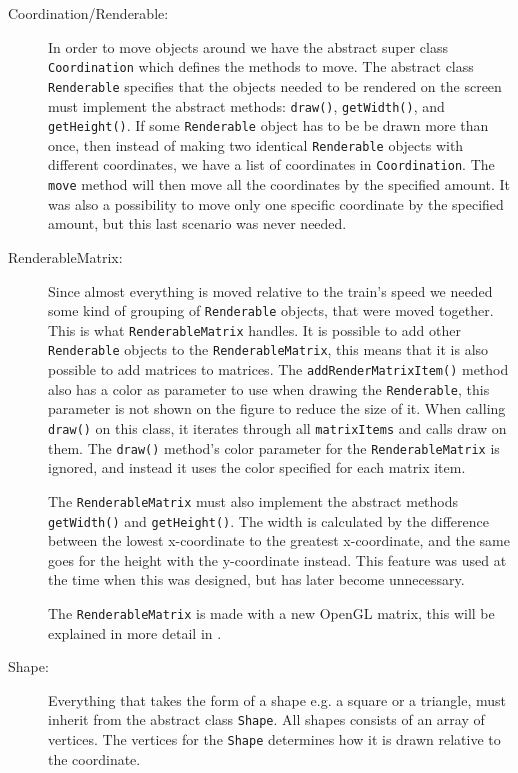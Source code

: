 \begin{description}
\item[Coordination/Renderable:] In order to move objects around we have the abstract super class \lstinline|Coordination| which defines the methods to move. The abstract class \lstinline|Renderable| specifies that the objects needed to be rendered on the screen must implement the abstract methods: \lstinline|draw()|, \lstinline|getWidth()|, and \lstinline|getHeight()|. If some \lstinline|Renderable| object has to be be drawn more than once, then instead of making two identical \lstinline|Renderable| objects with different coordinates, we have a list of coordinates in \lstinline|Coordination|. The \lstinline|move| method will then move all the coordinates by the specified amount. It was also a possibility to move only one specific coordinate by the specified amount, but this last scenario was never needed.

\item[RenderableMatrix:] Since almost everything is moved relative to the train's speed we needed some kind of grouping of \lstinline|Renderable| objects, that were moved together. This is what \lstinline|RenderableMatrix| handles. It is possible to add other \lstinline|Renderable| objects to the \lstinline|RenderableMatrix|, this means that it is also possible to add matrices to matrices. The \lstinline|addRenderMatrixItem()| method also has a color as parameter to use when drawing the \lstinline|Renderable|, this parameter is not shown on the figure to reduce the size of it. When calling \lstinline|draw()| on this class, it iterates through all \lstinline|matrixItems| and calls draw on them. The \lstinline|draw()| method's color parameter for the \lstinline|RenderableMatrix| is ignored, and instead it uses the color specified for each matrix item.

The \lstinline|RenderableMatrix| must also implement the abstract methods \lstinline|getWidth()| and \lstinline|getHeight()|. The width is calculated by the difference between the lowest x-coordinate to the greatest x-coordinate, and the same goes for the height with the y-coordinate instead. This feature was used at the time when this was designed, but has later become unnecessary.

The \lstinline|RenderableMatrix| is made with a new OpenGL matrix, this will be explained in more detail in .

\item[Shape:] Everything that takes the form of a shape e.g. a square or a triangle, must inherit from the abstract class \lstinline|Shape|. All shapes consists of an array of vertices. The vertices for the \lstinline|Shape| determines how it is drawn relative to the coordinate.


\end{description}
